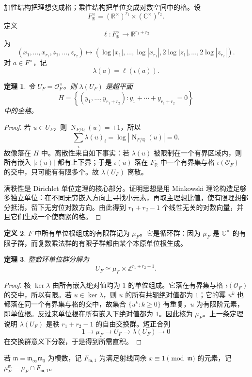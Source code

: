 \documentclass[11pt,a4paper,openany]{ctexbook}
\numberwithin{equation}{chapter}
\newcommand{\Q}{\mathbb{Q}}
\newcommand{\R}{\mathbb{R}}
\newcommand{\C}{\mathbb{C}}
\newcommand{\Z}{\mathbb{Z}}
\newcommand{\OF}{\mathcal{O}_F}
\newcommand{\Nm}{\operatorname{N}}
\theoremstyle{plain}
\newtheorem{theorem}{定理}[chapter]
\theoremstyle{definition}
\newtheorem{definition}[theorem]{定义}
\theoremstyle{remark}
\begin{document}
加性结构把理想变成格；乘性结构把单位变成对数空间中的格。设
\[
F_\R^\times=(\R^\times)^{r_1}\times(\C^\times)^{r_2}.
\]
定义
\[
\ell:F_\R^\times\to\R^{r_1+r_2}
\]
为
\[
(x_1,\dots,x_{r_1},z_1,\dots,z_{r_2})
\longmapsto
(\log|x_1|,\dots,\log|x_{r_1}|,
2\log|z_1|,\dots,2\log|z_{r_2}|).
\]
对 $a\in F^\times$，记
\[
\lambda(a)=\ell(\iota(a)).
\]

\begin{theorem}
令 $U_F=\OF^\times$。则 $\lambda(U_F)$ 是超平面
\[
H=\left\{(y_1,\dots,y_{r_1+r_2}):y_1+\cdots+y_{r_1+r_2}=0\right\}
\]
中的全格。
\end{theorem}

\begin{proof}
若 $u\in U_F$，则 $\Nm_{F/\Q}(u)=\pm1$，所以
\[
\sum_i \lambda(u)_i=\log|\Nm_{F/\Q}(u)|=0.
\]
故像落在 $H$ 中。离散性来自如下事实：若 $\lambda(u)$ 被限制在一个有界区域内，则所有嵌入 $|\iota(u)|$ 都有上下界；于是 $\iota(u)$ 落在 $F_\R$ 中一个有界集与格 $\iota(\OF)$ 的交中，只可能有有限多个。故 $\lambda(U_F)$ 离散。

满秩性是 Dirichlet 单位定理的核心部分。证明思想是用 Minkowski 理论构造足够多独立单位：在不同无穷嵌入方向上寻找小元素，再取主理想比值，使有限理想部分抵消，留下无穷位对数方向。由此得到 $r_1+r_2-1$ 个线性无关的对数向量，并且它们生成一个使商紧的格。
\end{proof}

\begin{definition}
$F$ 中所有单位根组成的有限群记为 $\mu_F$。它是循环群：因为 $\mu_F$ 是
$\C^\times$ 的有限子群，而复数乘法群的有限子群都由某个本原单位根生成。
\end{definition}

\begin{theorem}
整数环单位群分解为
\[
U_F\simeq \mu_F\times\Z^{r_1+r_2-1}.
\]
\end{theorem}

\begin{proof}
核 $\ker\lambda$ 由所有嵌入绝对值均为 $1$ 的单位组成。它落在有界集与格
$\iota(\OF)$ 的交中，所以有限。若 $u\in\ker\lambda$，则 $u$ 的所有共轭绝对值都为
$1$；它的幂 $u^k$ 也都落在同一个有界集与格的交中，故集合
$\{u^k:k\ge0\}$ 有重复，$u$ 为有限阶元素，即单位根。反过来单位根在所有嵌入下绝对值都为 $1$。因此核为
$\mu_F$。上一条定理说明 $\lambda(U_F)$ 是秩 $r_1+r_2-1$ 的自由交换群。短正合列
\[
1\to\mu_F\to U_F\to \lambda(U_F)\to0
\]
在交换群意义下分裂，于是得到所需直积。
\end{proof}

若 $\mathfrak m=\mathfrak m_\infty\mathfrak m_0$ 为模数，记 $F_{\mathfrak m,1}$ 为满足射线同余 $x\equiv1\pmod{\mathfrak m}$ 的元素，记 $\mu_F^{\mathfrak m}=\mu_F\cap F_{\mathfrak m,1}$。
\end{document}
